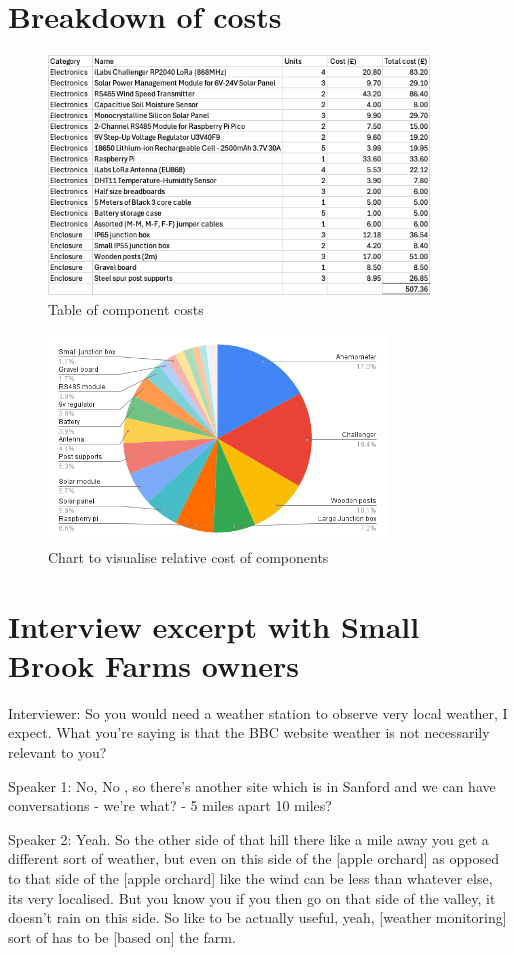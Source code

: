 \section{Breakdown of costs}

\begin{figure}[H]
    \centering
    \includegraphics[width=0.9\textwidth]{contents/appendix/fig5/table.jpg}
    \caption{Table of component costs}
    \label{fig:cost-table}
\end{figure}

\begin{figure}[H]
    \centering
    \includegraphics[width=0.8\textwidth]{contents/appendix/fig5/chart.png}
    \caption{Chart to visualise relative cost of components}
    \label{fig:cost-chart}
\end{figure}

\section{Interview excerpt with Small Brook Farms owners}\label{sec:small-brook-interview}

Interviewer: So you would need a weather station to observe very local weather, I expect.
What you're saying is that the BBC website weather is not necessarily relevant
to you?

Speaker 1: No, No , so there's another site which is in Sanford and we can have
conversations - we're what? - 5 miles apart 10 miles? 

Speaker 2: Yeah. So the other side of that hill there like a mile away you get a
different sort of weather, but even on this side of the [apple orchard] as
opposed to that side of the [apple orchard] like the wind can be less than
whatever else, its very localised. But you know you if you then go on that side
of the valley, it doesn't rain on this side. So like to be actually useful,
yeah, [weather monitoring] sort of has to be [based on] the farm.
